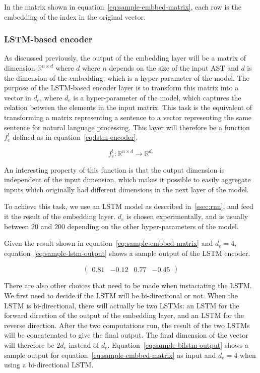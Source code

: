 In the matrix shown in equation~\ref{eq:sample-embbed-matrix}, each row is the
embedding of the index in the original vector.
%
\subsubsection{LSTM-based encoder}
As discussed previously, the output of the embedding layer will be a matrix of
dimension $\mathbb{R}^{n\times d}$ where $d$ where $n$ depends on the size of
the input AST and $d$ is the dimension of the embedding, which is a
hyper-parameter of the model. The purpose of the LSTM-based encoder layer is to
transform this matrix into a vector in $d_e$, where $d_e$ is a hyper-parameter of
the model, which captures the relation between the elements in the input matrix.
This task is the equivalent of transforming a matrix representing a sentence to
a vector representing the same sentence for natural language processing.
This layer will therefore be a function $f_e^l$ defined as in
equation~\ref{eq:lstm-encoder}.

\begin{equation}
  \label{eq:lstm-encoder}
  f_e^l : \mathbb{R}^{n\times d} \rightarrow \mathbb{R}^{d_e}
\end{equation}

An interesting property of this function is that the output dimension is
independent of the input dimension, which makes it possible to easily aggregate
inputs which originally had different dimensions in the next layer of the model.

To achieve this task, we use an LSTM model as described in~\ref{ssec:rnn}, and
feed it the result of the embedding layer. $d_e$ is chosen experimentally, and is
usually between $20$ and $200$ depending on the other hyper-parameters of the
model.

Given the result shown in equation~\ref{eq:sample-embbed-matrix} and $d_e = 4$,
equation~\ref{eq:sample-lstm-output} shows a sample output of the LSTM encoder.

\begin{equation}
  \label{eq:sample-lstm-output}
  \begin{pmatrix}
    0.81 & -0.12 & 0.77 & -0.45
  \end{pmatrix}
\end{equation}

There are also other choices that need to be made when instaciating the
LSTM. We first need to decide if the LSTM will be bi-directional or not. When
the LSTM is bi-directional, there will actually be two LSTMs: an LSTM for the
forward direction of the output of the embedding layer, and an LSTM for the
reverse direction. After the two computations run, the result of the two LSTMs
will be concatenated to give the final output. The final dimension of the vector
will therefore be $2d_e$ instead of $d_e$. Equation~\ref{eq:sample-bilstm-output}
shows a sample output for equation~\ref{eq:sample-embbed-matrix} as input and
$d_e = 4$ when using a bi-directional LSTM.

